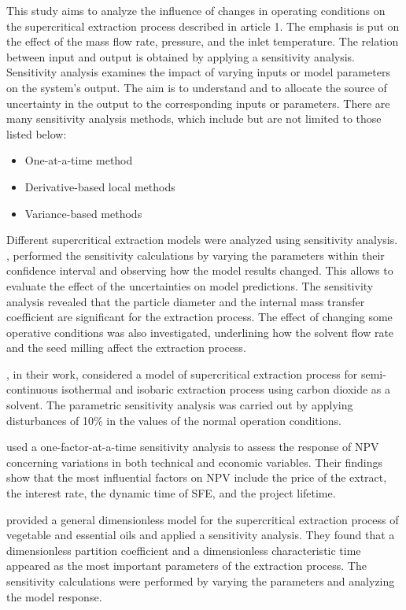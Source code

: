 \documentclass[../Article_Design_of_Experiment.tex]{subfiles}
\begin{document}
	
	This study aims to analyze the influence of changes in operating conditions on the supercritical extraction process described in {\color{red}article 1}. The emphasis is put on the effect of the mass flow rate, pressure, and the inlet temperature. The relation between input and output is obtained by applying a sensitivity analysis. Sensitivity analysis examines the impact of varying inputs or model parameters on the system's output. The aim is to understand and to allocate the source of uncertainty in the output to the corresponding inputs or parameters. There are many sensitivity analysis methods, which include but are not limited to those listed below:
	
	\begin{itemize}
		\item One-at-a-time method
		\item Derivative-based local methods
		\item Variance-based methods
	\end{itemize}
	
	Different supercritical extraction models were analyzed using sensitivity analysis. \citet{Fiori_2007}, performed the sensitivity calculations by varying the parameters within their confidence interval and observing how the model results changed. This allows to evaluate the effect of the uncertainties on model predictions. The sensitivity analysis revealed that the particle diameter and the internal mass transfer coefficient are significant for the extraction process. The effect of changing some operative conditions was also investigated, underlining how the solvent flow rate and the seed milling affect the extraction process.
	
	\citet{Santos2000}, in their work, considered a model of supercritical extraction process for semi-continuous isothermal and isobaric extraction process using carbon dioxide as a solvent. The parametric sensitivity analysis was carried out by applying disturbances of 10\% in the values of the normal operation conditions.
	
	\citet{Hatami2024} used a one-factor-at-a-time sensitivity analysis to assess the response of NPV concerning variations in both technical and economic variables. Their findings show that the most influential factors on NPV include the price of the extract, the interest rate, the dynamic time of SFE, and the project lifetime.
	
	\citet{Poletto1996} provided a general dimensionless model for the supercritical extraction process of vegetable and essential oils and applied a sensitivity analysis. They found that a dimensionless partition coefficient and a dimensionless characteristic time appeared as the most important parameters of the extraction process. The sensitivity calculations were performed by varying the parameters and analyzing the model response.
	
\end{document}

